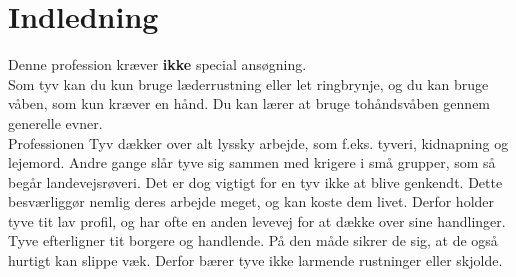 
\chapter*{Indledning}

Denne profession kræver \textbf{ikke} special ansøgning.\\
Som tyv kan du kun bruge læderrustning eller let ringbrynje, og du kan bruge våben, som kun kræver en hånd. Du kan lærer at bruge tohåndsvåben gennem generelle evner.\\

Professionen Tyv dækker over alt lyssky arbejde, som f.eks. tyveri, kidnapning og lejemord. Andre
gange slår tyve sig sammen med krigere i små grupper, som så begår landevejsrøveri. Det er dog vigtigt for en tyv ikke at blive genkendt. Dette besværliggør nemlig deres arbejde meget, og kan koste dem livet. Derfor holder tyve tit lav profil, og har ofte en anden levevej for at dække over sine handlinger.\\
Tyve efterligner tit borgere og handlende. På den måde sikrer de sig, at de også hurtigt
kan slippe væk. Derfor bærer tyve ikke larmende rustninger eller skjolde.\\


